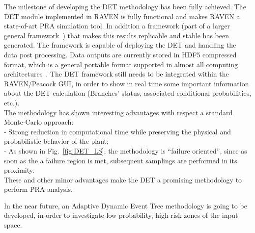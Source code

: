 \label{sec:conclusions}
The milestone of developing the DET methodology has been fully achieved. The DET module implemented in RAVEN is fully functional and makes RAVEN a state-of-art PRA simulation tool. In addition a framework (part of a larger general framework~\cite{RAVENFY13}) that makes this results replicable and stable has been generated. The framework is capable of deploying the DET and handling the data post processing. Data outputs are currently stored in HDF5 compressed format, which is a general portable format supported in almost all computing architectures~\cite{HDF5}. 
The DET framework still needs to be integrated within the RAVEN/Peacock GUI, in order to show in real time some important information about the DET calculation (Branches' status, associated conditional probabilities, etc.).
\\The methodology has shown interesting advantages with respect a standard Monte-Carlo approach:    
\\ - Strong reduction in computational time while preserving the physical and probabilistic behavior of the plant;
\\ - As shown in Fig.~\ref{fig:DET_LS}, the methodology is ``failure oriented'', since as soon as the a failure region is met, subsequent samplings are performed in its proximity. 
\\These and other minor advantages make the DET a promising methodology to perform PRA analysis.

In the near future, an Adaptive Dynamic Event Tree methodology is going to be developed, in order to investigate low probability, high risk zones of the input space.
  
